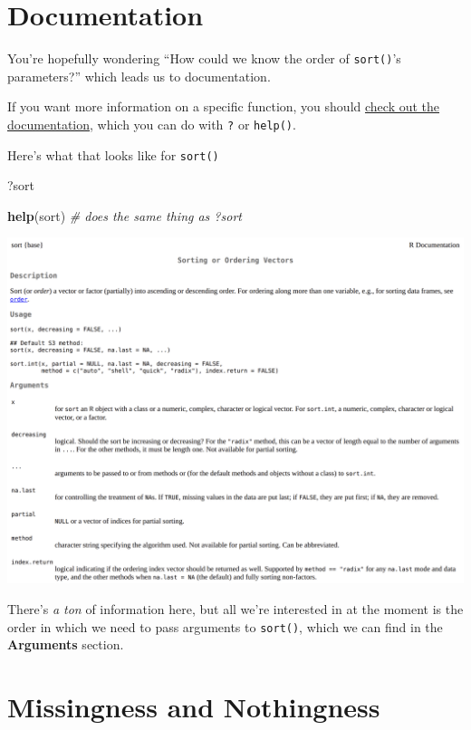 \documentclass[
]{report}
\newenvironment{Shaded}{\begin{snugshade}}{\end{snugshade}}
\newcommand{\CommentTok}[1]{\textcolor[rgb]{0.56,0.35,0.01}{\textit{#1}}}
\newcommand{\KeywordTok}[1]{\textcolor[rgb]{0.13,0.29,0.53}{\textbf{#1}}}
\newcommand{\NormalTok}[1]{#1}
\begin{document}
\hypertarget{documentation}{%
\section{Documentation}\label{documentation}}

You're hopefully wondering ``How could we know the order of \texttt{sort()}'s parameters?'' which leads us to documentation.

If you want more information on a specific function, you should \href{https://en.wikipedia.org/wiki/RTFM}{check out the documentation}, which you can do with \texttt{?} or \texttt{help()}.

Here's what that looks like for \texttt{sort()}

\begin{Shaded}
\begin{Highlighting}[]
\NormalTok{?sort }
\end{Highlighting}
\end{Shaded}

\begin{Shaded}
\begin{Highlighting}[]
\KeywordTok{help}\NormalTok{(sort) }\CommentTok{\# does the same thing as \textasciigrave{}?sort\textasciigrave{}}
\end{Highlighting}
\end{Shaded}

\begin{center}\includegraphics[width=0.7\linewidth]{images/sort-documentation} \end{center}

There's \emph{a ton} of information here, but all we're interested in at the moment is the order in which we need to pass arguments to \texttt{sort()}, which we can find in the \textbf{Arguments} section.

\hypertarget{missingness-and-nothingness}{%
\section{Missingness and Nothingness}\label{missingness-and-nothingness}}
\end{document}
